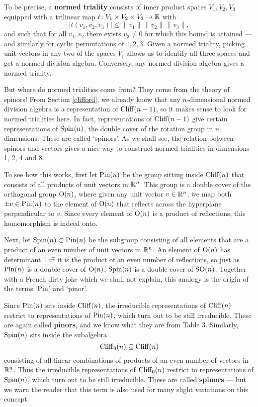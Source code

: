 To be precise, a {\bf normed triality} consists of inner product  
spaces $V_1, V_2, V_3$ equipped with a trilinear map   
$t \colon V_1 \times V_2 \times V_3 \to {\mathbb R}$ with  
\[      |t(v_1, v_2, v_3)| \le \|v_1\| \, \|v_2\| \, \|v_3 \|,   \]    
and such that for all $v_1, v_2$ there exists $v_3 \ne 0$ for which this   
bound is attained --- and similarly for cyclic permutations of $1,2,3$.    
Given a normed triality, picking unit vectors in any two of the spaces 
$V_i$ allows us to identify all three spaces and get a normed division 
algebra.  Conversely, any normed division algebra gives a normed triality.    
  
But where do normed trialities come from?  They come from the theory of  
spinors!  From Section \ref{clifford}, we already know that any  
$n$-dimensional normed division algebra is a representation of  
${\rm Cliff}(n-1)$, so it makes sense to look for normed trialities here. 
In fact, representations of ${\rm Cliff}(n-1)$ give certain representations  
of ${\rm Spin}(n)$, the double cover of the rotation group in $n$ dimensions.  
These are called `spinors'.  As we shall see, the relation between   
spinors and vectors gives a nice way to construct normed trialities in  
dimensions 1, 2, 4 and 8.  
  
To see how this works, first let ${\rm Pin}(n)$ be the group sitting inside  
${\rm Cliff}(n)$ that consists of all products of unit vectors in ${\mathbb R}^n$.  
This group is a double cover of the orthogonal group ${\rm O}(n)$, where  
given any unit vector $v \in {\mathbb R}^n$, we map both $\pm v \in {\rm Pin}(n)$ to  
the element of ${\rm O}(n)$ that reflects across the hyperplane perpendicular to  
$v$.  Since every element of ${\rm O}(n)$ is a product of reflections, this  
homomorphism is indeed onto.      
  
Next, let ${\rm Spin}(n) \subset {\rm Pin}(n)$ be the subgroup consisting of all  
elements that are a product of an even number of unit vectors in  
${\mathbb R}^n$.  An element of ${\rm O}(n)$ has determinant 1 iff it is the product  
of an even number of reflections, so just as ${\rm Pin}(n)$ is a double cover  
of ${\rm O}(n)$, ${\rm Spin}(n)$ is a double cover of ${\rm SO}(n)$.  Together with a  
French dirty joke which we shall not explain, this analogy is the origin  
of the terms `${\rm Pin}$' and `pinor'.    
  
Since ${\rm Pin}(n)$ sits inside ${\rm Cliff}(n)$, the irreducible representations
of ${\rm Cliff}(n)$ restrict to representations of ${\rm Pin}(n)$, which turn out
to be still irreducible.  These are again called {\bf pinors}, and we
know what they are from Table 3.  Similarly, ${\rm Spin}(n)$ sits inside the
subalgebra
\[            {\rm Cliff}_0(n) \subseteq {\rm Cliff}(n) \]  
consisting of all linear combinations of products of an even number of
vectors in ${\mathbb R}^n$.  Thus the irreducible representations of
${\rm Cliff}_0(n)$ restrict to representations of ${\rm Spin}(n)$, which turn out
to be still irreducible.  These are called {\bf spinors} --- but we warn
the reader that this term is also used for many slight variations on
this concept.
  
